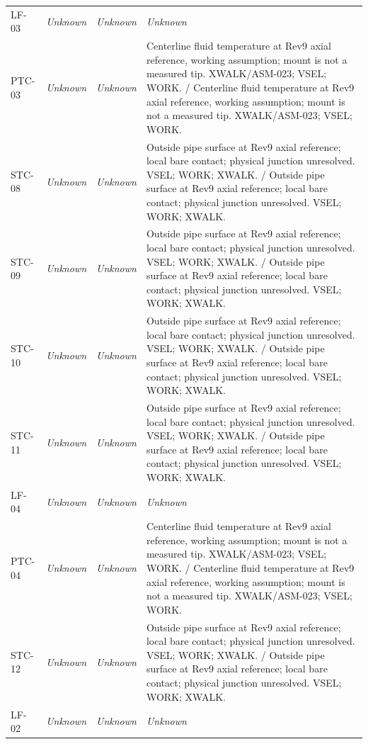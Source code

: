 \documentclass[11pt]{article}
\begin{document}
\begin{longtable}{>{\raggedright\arraybackslash}p{}>{\raggedright\arraybackslash}p{}>{\raggedright\arraybackslash}p{}>{\raggedright\arraybackslash}p{}}
LF-03 & \textit{Unknown} & \textit{Unknown} & \textit{Unknown} \\[3pt]
PTC-03 & \textit{Unknown} & \textit{Unknown} & Centerline fluid temperature at Rev9 axial reference, working assumption; mount is not a measured tip. XWALK/ASM-023; VSEL; WORK. / Centerline fluid temperature at Rev9 axial reference, working assumption; mount is not a measured tip. XWALK/ASM-023; VSEL; WORK. \\[3pt]
STC-08 & \textit{Unknown} & \textit{Unknown} & Outside pipe surface at Rev9 axial reference; local bare contact; physical junction unresolved. VSEL; WORK; XWALK. / Outside pipe surface at Rev9 axial reference; local bare contact; physical junction unresolved. VSEL; WORK; XWALK. \\[3pt]
STC-09 & \textit{Unknown} & \textit{Unknown} & Outside pipe surface at Rev9 axial reference; local bare contact; physical junction unresolved. VSEL; WORK; XWALK. / Outside pipe surface at Rev9 axial reference; local bare contact; physical junction unresolved. VSEL; WORK; XWALK. \\[3pt]
STC-10 & \textit{Unknown} & \textit{Unknown} & Outside pipe surface at Rev9 axial reference; local bare contact; physical junction unresolved. VSEL; WORK; XWALK. / Outside pipe surface at Rev9 axial reference; local bare contact; physical junction unresolved. VSEL; WORK; XWALK. \\[3pt]
STC-11 & \textit{Unknown} & \textit{Unknown} & Outside pipe surface at Rev9 axial reference; local bare contact; physical junction unresolved. VSEL; WORK; XWALK. / Outside pipe surface at Rev9 axial reference; local bare contact; physical junction unresolved. VSEL; WORK; XWALK. \\[3pt]
LF-04 & \textit{Unknown} & \textit{Unknown} & \textit{Unknown} \\[3pt]
PTC-04 & \textit{Unknown} & \textit{Unknown} & Centerline fluid temperature at Rev9 axial reference, working assumption; mount is not a measured tip. XWALK/ASM-023; VSEL; WORK. / Centerline fluid temperature at Rev9 axial reference, working assumption; mount is not a measured tip. XWALK/ASM-023; VSEL; WORK. \\[3pt]
STC-12 & \textit{Unknown} & \textit{Unknown} & Outside pipe surface at Rev9 axial reference; local bare contact; physical junction unresolved. VSEL; WORK; XWALK. / Outside pipe surface at Rev9 axial reference; local bare contact; physical junction unresolved. VSEL; WORK; XWALK. \\[3pt]
LF-02 & \textit{Unknown} & \textit{Unknown} & \textit{Unknown} \\[3pt]

\end{longtable}
\end{document}
